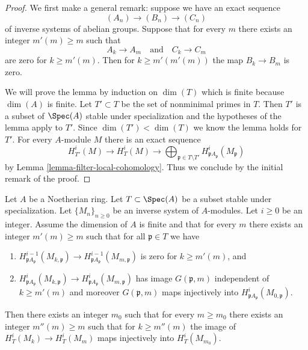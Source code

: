 \begin{proof}
We first make a general remark: suppose we have an exact
sequence
$$
(A_n) \to (B_n) \to (C_n)
$$
of inverse systems of abelian groups. Suppose that for every
$m$ there exists an integer $m'(m) \geq m$ such that
$$
A_k \to A_m
\quad\text{and}\quad
C_k \to C_m
$$
are zero for $k \geq m'(m)$. Then for $k \geq m'(m'(m))$
the map $B_k \to B_m$ is zero.

\medskip\noindent
We will prove the lemma by induction on $\dim(T)$ which is
finite because $\dim(A)$ is finite. Let $T' \subset T$ be
the set of nonminimal primes in $T$. Then $T'$
is a subset of $\Spec(A)$ stable under specialization
and the hypotheses of the lemma apply to $T'$.
Since $\dim(T') < \dim(T)$ we know the lemma holds for $T'$.
For every $A$-module $M$ there is an exact sequence
$$
H^i_{T'}(M) \to H^i_T(M) \to
\bigoplus\nolimits_{\mathfrak p \in T \setminus T'}
H^i_{\mathfrak p A_\mathfrak p}(M_\mathfrak p)
$$
by Lemma \ref{lemma-filter-local-cohomology}.
Thus we conclude by the initial remark of the proof.
\end{proof}

\begin{lemma}
\label{lemma-essential-image}
Let $A$ be a Noetherian ring. Let $T \subset \Spec(A)$ be a subset
stable under specialization. Let $\{M_n\}_{n \geq 0}$ be an inverse system
of $A$-modules. Let $i \geq 0$ be an integer. Assume the dimension of $A$
is finite and that for every $m$ there exists an integer $m'(m) \geq m$
such that for all $\mathfrak p \in T$ we have
\begin{enumerate}
\item $H^{i - 1}_{\mathfrak p A_\mathfrak p}(M_{k, \mathfrak p})
\to H^{i - 1}_{\mathfrak p A_\mathfrak p}(M_{m, \mathfrak p})$
is zero for $k \geq m'(m)$, and
\item $ H^i_{\mathfrak p A_\mathfrak p}(M_{k, \mathfrak p}) \to
H^i_{\mathfrak p A_\mathfrak p}(M_{m, \mathfrak p})$
has image $G(\mathfrak p, m)$ independent of $k \geq m'(m)$ and moreover
$G(\mathfrak p, m)$ maps injectively into
$H^i_{\mathfrak p A_\mathfrak p}(M_{0, \mathfrak p})$.
\end{enumerate}
Then there exists an integer $m_0$ such that for every $m \geq m_0$
there exists an integer $m''(m) \geq m$ such that
for $k \geq m''(m)$ the image of $H^i_T(M_k) \to H^i_T(M_m)$
maps injectively into $H^i_T(M_{m_0})$.
\end{lemma}

